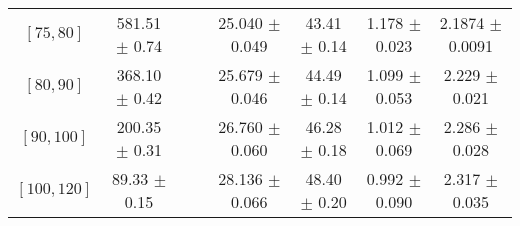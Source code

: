 \begin{tabular}{c||c|c|c|c|c|c|c}
$[75, 80]$ & 581.51 $\pm$ 0.74 &  &  & 25.040 $\pm$ 0.049 & 43.41 $\pm$ 0.14 & 1.178 $\pm$ 0.023 & 2.1874 $\pm$ 0.0091\\
$[80, 90]$ & 368.10 $\pm$ 0.42 &  &  & 25.679 $\pm$ 0.046 & 44.49 $\pm$ 0.14 & 1.099 $\pm$ 0.053 & 2.229 $\pm$ 0.021\\
$[90, 100]$ & 200.35 $\pm$ 0.31 &  &  & 26.760 $\pm$ 0.060 & 46.28 $\pm$ 0.18 & 1.012 $\pm$ 0.069 & 2.286 $\pm$ 0.028\\
$[100, 120]$ & 89.33 $\pm$ 0.15 &  &  & 28.136 $\pm$ 0.066 & 48.40 $\pm$ 0.20 & 0.992 $\pm$ 0.090 & 2.317 $\pm$ 0.035\\
\end{tabular}
